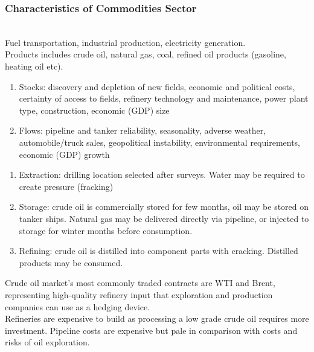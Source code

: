 \subsubsection{Characteristics of Commodities Sector}

\begin{remark}  \\
Fuel transportation, industrial production, electricity generation.\\
Products includes crude oil, natural gas, coal, refined oil products (gasoline, heating oil etc).
\begin{enumerate}[label=\roman*.]
\setlength{\itemsep}{0pt}
\item Stocks: discovery and depletion of new fields, economic and political costs, certainty of access to fields, refinery technology and maintenance, power plant type, construction, economic (GDP) size
\item Flows: pipeline and tanker reliability, seasonality, adverse weather, automobile/truck sales, geopolitical instability, environmental requirements, economic (GDP) growth
\end{enumerate}
\end{remark}

\begin{remark} 
\begin{enumerate}[label=\roman*.]
\setlength{\itemsep}{0pt}
\item Extraction: drilling location selected after surveys. Water may be required to create pressure (fracking)
\item Storage: crude oil is commercially stored for few months, oil may be stored on tanker ships. Natural gas may be delivered directly via pipeline, or injected to storage for winter months before consumption.
\item Refining: crude oil is distilled into component parts with cracking. Distilled products may be consumed.
\end{enumerate}
Crude oil market's most commonly traded contracts are WTI and Brent, representing high-quality refinery input that exploration and production companies can use as a hedging device.\\
Refineries are expensive to build as processing a low grade crude oil requires more investment. Pipeline costs are expensive but pale in comparison with costs and risks of oil exploration.
\end{remark}

